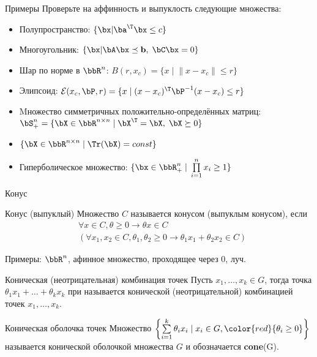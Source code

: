 \documentclass[12pt,russian]{beamer}
\begin{document}
\begin{frame}{Примеры}
Проверьте на аффинность и выпуклость следующие множества:
\begin{itemize}
\item Полупространство: $\{ \bx | \ba^{\T} \bx \leq c \}$
\item Многоугольник: $\{ \bx | \bA\bx \preceq \mathbf{b}, \; \bC\bx = 0 \}$
\item Шар по норме в $\bbR^n$: $B(r, x_c) = \{ x \; | \; \| x - x_c \| \leq r \}$
\item Элипсоид: $\mathcal{E}(x_c, \bP, r) = \{ x \; | \; (x - x_c)^{\T}\bP^{-1} (x - x_c) \leq r \}$
\item Mножество симметричных положительно-определённых матриц: $\bS^n_+ = \{ \bX \in \bbR^{n \times n} \; | \; \bX^{\T} = \bX, \; \bX \succeq 0 \}$
\item $\{ \bX \in \bbR^{n \times n} \; | \; \Tr(\bX) = const \}$
\item Гиперболическое множество: $\{ \bx \in \bbR^n_+ \; | \; \prod\limits_{i=1}^n x_i \geq 1 \}$
\end{itemize}
\end{frame}

\begin{frame}{Конус}
\small
\begin{block}{Конус (выпуклый)}
Множество $C$ называется конусом (выпуклым конусом), если 
\vspace{-4mm}
\begin{equation*}
\begin{split}
& \forall x \in C, \theta \geq 0 \rightarrow \theta x \in C \\
& (\forall x_1, x_2 \in C, \theta_1, \theta_2 \geq 0 \rightarrow \theta_1 x_1 + \theta_2 x_2 \in C)
\end{split}
\end{equation*}
\vspace{-4mm}
\end{block}
Примеры: $\bbR^n$, афинное множество, проходящее через 0, луч.
\begin{block}{Коническая (неотрицательная) комбинация точек}
Пусть $x_1, \ldots, x_k \in G$, тогда точка $\theta_1 x_1 + \ldots + \theta_k x_k$ при {\color{red}{$\theta_i \geq 0$}} называется конической (неотрицательной) комбинацией точек $x_1,\ldots,x_k$.
\end{block}

\begin{block}{Коническая оболочка точек}
Множество $\left\{ \sum\limits_{i=1}^k \theta_i x_i \; | \; x_i \in G, {\color{red}{\theta_i \geq 0}} \right\}$ называется конической оболочкой множества $G$ и обозначается \textbf{cone}(G).
\end{block}
\end{frame}
\end{document}
